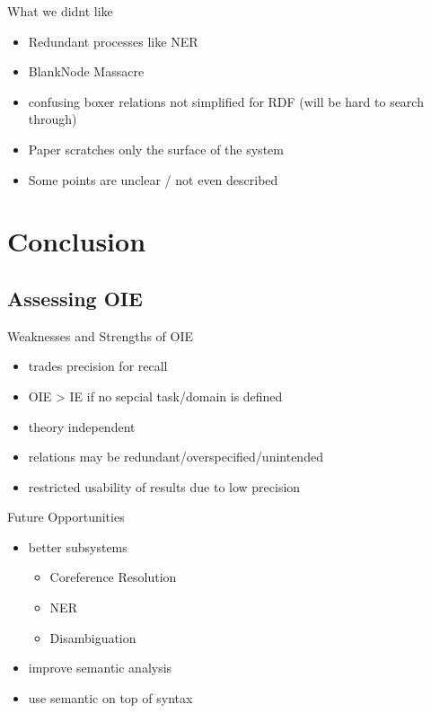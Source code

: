 \documentclass[11pt]{beamer}
\begin{document}
		\begin{frame}{What we didnt like}
			\begin{itemize}
				\item<1-5> Redundant processes like NER
				\item<2-5> BlankNode Massacre
				\item<3-5> confusing boxer relations not simplified for RDF (will be hard to search through)
				
				\vspace{15pt}
				
				\item<4-5> Paper scratches only the surface of the system
				\item<5> Some points are unclear / not even described
			\end{itemize}
		\end{frame}
\section{Conclusion}
	\subsection{Assessing OIE}
	\begin{frame}{Weaknesses and Strengths of OIE}
		\begin{itemize}
			\item<1-5> trades precision for recall
			\item<2-5> OIE > IE if no sepcial task/domain is defined
			\item<3-5> theory independent
			\item<4-5> relations may be redundant/overspecified/unintended
			\item<5> restricted usability of results due to low precision
		\end{itemize}
	\end{frame}
	\begin{frame}{Future Opportunities}
		\begin{itemize}
			\item<1-6> better subsystems\\
				\begin{itemize}
					\item<2-6> Coreference Resolution
					\item<3-6> NER
					\item<4-6> Disambiguation
				\end{itemize}
			\item<5-6> improve semantic analysis
			\item<6> use semantic on top of syntax
		\end{itemize}
	\end{frame}
	
\end{document}
